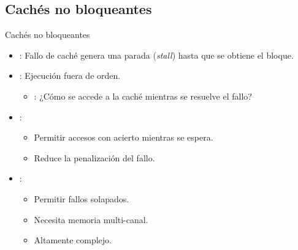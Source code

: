 \subsection{Cachés no bloqueantes}

\begin{frame}[t]{Cachés no bloqueantes}
\begin{itemize}
  \item {}: 
        Fallo de caché genera una parada (\emph{stall}) hasta que se obtiene el bloque.

  \item {}: Ejecución fuera de orden.
    \begin{itemize}
      \item {}: 
            ¿Cómo se accede a la caché mientras se resuelve el fallo?
    \end{itemize}

  \item {}:
    \begin{itemize}
      \item Permitir accesos con acierto mientras se espera.
      \item Reduce la penalización del fallo.
    \end{itemize}

  \item {}:
    \begin{itemize}
      \item Permitir fallos solapados.
      \item Necesita memoria multi-canal.
      \item Altamente complejo.
    \end{itemize}
\end{itemize}
\end{frame}
